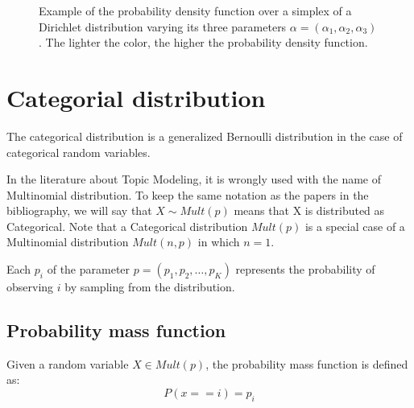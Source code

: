 \begin{figure}[h]
    \centering
    \hfill
    \caption{Example of the probability density function over a simplex of a Dirichlet distribution varying its three parameters $\alpha = (\alpha_1, \alpha_2, \alpha_3)$. The lighter the color, the higher the probability density function.}
    \label{fig:dirparams}
\end{figure}

\section{Categorial distribution}
The categorical distribution is a generalized Bernoulli distribution in the case of categorical random variables.

In the literature about Topic Modeling, it is wrongly used with the name of Multinomial distribution.
To keep the same notation as the papers in the bibliography, we will say that $X \sim \mathit{Mult}(p)$ means that X is distributed as Categorical.
Note that a Categorical distribution $\mathit{Mult}(p)$ is a special case of a Multinomial distribution $\mathit{Mult}(n, p)$ in which $n=1$.

Each $p_i$ of the parameter $p = (p_1, p_2, \dots, p_K)$ represents the probability of observing $i$ by sampling from the distribution.

\subsection{Probability mass function}
Given a random variable $X \in \mathit{Mult}(p)$, the probability mass function is defined as:
$$P(x == i) = p_i$$